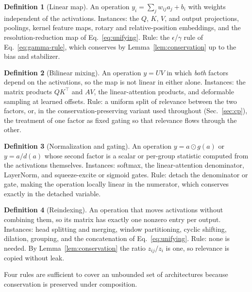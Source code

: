\documentclass[lettersize,journal]{IEEEtran}
\theoremstyle{definition}
\newtheorem{definition}{Definition}
\theoremstyle{plain}
\begin{document}
\begin{definition}[Linear map]
\label{def:linear}
An operation $y_i=\sum_j w_{ij}a_j + b_i$ with weights independent of the
activations. Instances: the $Q$, $K$, $V$, and output projections, poolings,
kernel feature maps, rotary and relative-position embeddings, and the
resolution-reduction map of Eq.~\eqref{eq:unifying}. Rule: the $\epsilon$/$\gamma$
rule of Eq.~\eqref{eq:gamma-rule}, which conserves by Lemma~\ref{lem:conservation}
up to the bias and stabilizer.
\end{definition}

\begin{definition}[Bilinear mixing]
\label{def:bilinear}
An operation $y=UV$ in which \emph{both} factors depend on the activations, so
the map is not linear in either alone. Instances: the matrix products $QK^\top$ and
$AV$, the linear-attention products, and deformable sampling at learned offsets.
Rule: a uniform split of relevance between the two factors, or, in the
conservation-preserving variant used throughout (Sec.~\ref{sec:cp}), the
treatment of one factor as fixed gating so that relevance flows through the other.
\end{definition}

\begin{definition}[Normalization and gating]
\label{def:norm}
An operation $y = a \odot g(a)$ or $y = a / d(a)$ whose second factor is a scalar
or per-group statistic computed from the activations themselves. Instances:
softmax, the linear-attention denominator, LayerNorm, and squeeze-excite or
sigmoid gates. Rule: detach the denominator or gate, making the operation locally
linear in the numerator, which conserves exactly in the detached variable.
\end{definition}

\begin{definition}[Reindexing]
\label{def:reindex}
An operation that moves activations without combining them, so its matrix has exactly one nonzero entry per output. Instances: head splitting and merging, window partitioning, cyclic shifting, dilation, grouping, and the concatenation of Eq.~\eqref{eq:unifying}. Rule: none is needed. By Lemma~\ref{lem:conservation} the ratio $z_{ij}/z_i$ is one, so relevance is copied without leak.
\end{definition}

\noindent Four rules are sufficient to cover an unbounded set of architectures because conservation is preserved under composition.
\end{document}
